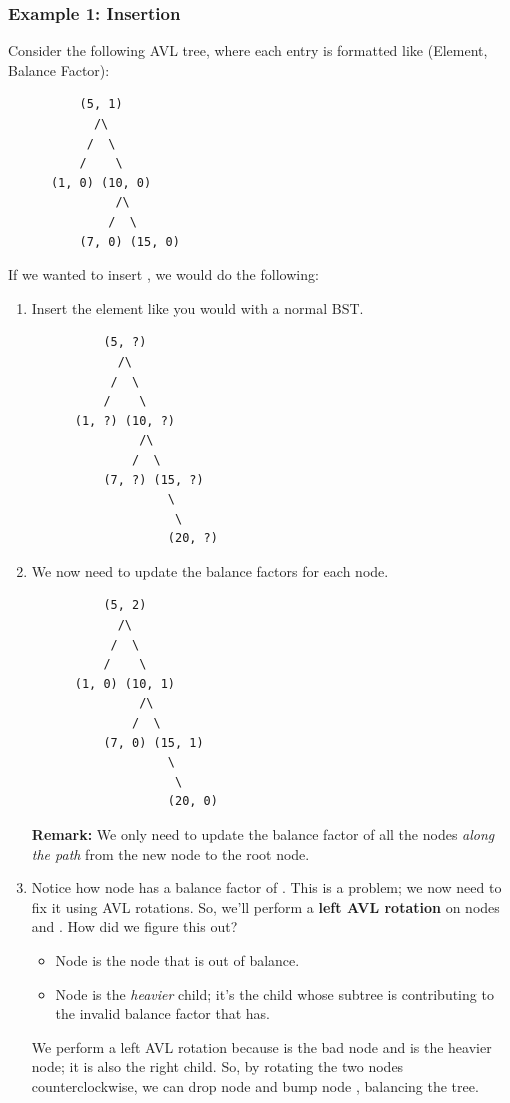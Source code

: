 \documentclass[letterpaper]{article}
\begin{document}
\subsubsection{Example 1: Insertion}
Consider the following AVL tree, where each entry is formatted like (Element, Balance Factor): 
\begin{verbatim}
          (5, 1)
            /\ 
           /  \ 
          /    \ 
      (1, 0) (10, 0) 
               /\ 
              /  \
          (7, 0) (15, 0)
\end{verbatim}
If we wanted to insert , we would do the following: 
\begin{enumerate}[(1)]
    \item Insert the element like you would with a normal BST. 
    \begin{verbatim}
          (5, ?)
            /\ 
           /  \ 
          /    \ 
      (1, ?) (10, ?) 
               /\ 
              /  \
          (7, ?) (15, ?)
                   \ 
                    \ 
                   (20, ?)
    \end{verbatim}

    \item We now need to update the balance factors for each node. 
    \begin{verbatim}
          (5, 2)
            /\ 
           /  \ 
          /    \ 
      (1, 0) (10, 1) 
               /\ 
              /  \
          (7, 0) (15, 1)
                   \ 
                    \ 
                   (20, 0)
    \end{verbatim}
    \textbf{Remark:} We only need to update the balance factor of all the nodes \emph{along the path} from the new node to the root node. 

    \item Notice how node  has a balance factor of . This is a problem; we now need to fix it using AVL rotations. So, we'll perform a \textbf{left AVL rotation} on nodes  and . How did we figure this out? 
    \begin{itemize}
        \item Node  is the node that is out of balance. 
        \item Node \code{10} is the \emph{heavier} child; it's the child whose subtree is contributing to the invalid balance factor that  has. 
    \end{itemize}
    We perform a left AVL rotation because  is the bad node and  is the heavier node; it is also the right child. So, by rotating the two nodes counterclockwise, we can drop node  and bump node , balancing the tree. 


\end{enumerate}
\end{document}
